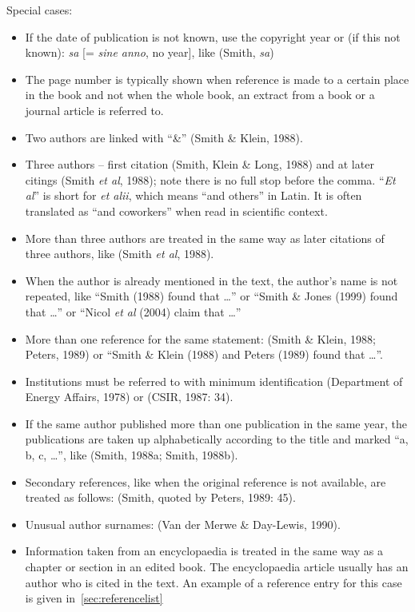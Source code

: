 \documentclass[a5paper, 10pt]{article}
\begin{document}
Special cases:
\begin{itemize}
\item If the date of publication is not known, use the copyright year
  or (if this not known): \emph{sa} [= \emph{sine anno}, no year], like (Smith,
  \emph{sa})
\item The page number is typically shown when reference is made to a
  certain place in the book and not when the whole book, an extract
  from a book or a journal article is referred to.
\item Two authors are linked with ``\&'' (Smith \& Klein, 1988).
\item Three authors -- first citation (Smith, Klein \& Long, 1988) and
  at later citings (Smith \emph{et al}, 1988); note there is no full
  stop before the comma.  ``\emph{Et al}'' is short for \emph{et alii},
  which means ``and others'' in Latin.  It is often translated as
  ``and coworkers'' when read in scientific context.
\item More than three authors are treated in the same way as later
  citations of three authors, like (Smith \emph{et al}, 1988).
\item When the author is already mentioned in the text, the author's
  name is not repeated, like ``Smith (1988) found that \dots'' or
  ``Smith \& Jones (1999) found that \dots'' or ``Nicol \emph{et al} (2004)
  claim that \dots''
\item More than one reference for the same statement: (Smith \& Klein,
  1988; Peters, 1989) or ``Smith \& Klein (1988) and Peters
  (1989) found that \dots''.
\item Institutions must be referred to with minimum identification
  (Department of Energy Affairs, 1978) or (CSIR, 1987: 34).
\item If the same author published more than one publication in the
  same year, the publications are taken up alphabetically according to
  the title and marked ``a, b, c, \dots'', like (Smith, 1988a; Smith,
  1988b).
\item Secondary references, like when the original reference is not
  available, are treated as follows: (Smith, quoted by Peters, 1989:
  45).
\item Unusual author surnames: (Van der Merwe \& Day-Lewis, 1990).
\item Information taken from an encyclopaedia is treated in the same
  way as a chapter or section in an edited book.  The encyclopaedia
  article usually has an author who is cited in the text.  An example
  of a reference entry for this case is given in~\ref{sec:referencelist}
\end{itemize}
\end{document}
